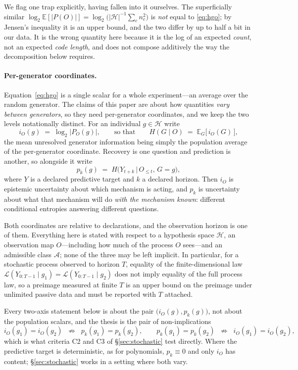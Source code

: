 \documentclass[11pt]{article}
\newcommand{\HH}{\ensuremath{\mathcal{H}}}
\begin{document}
We flag one trap explicitly, having fallen into it ourselves. The superficially similar
$\log_2 \mathbb{E}[|P(O)|] = \log_2\big(|\HH|^{-1}\sum_c n_c^2\big)$ is \emph{not}
equal to \eqref{eq:hgo}; by Jensen's inequality it is an upper bound, and the two
differ by up to half a bit in our data. It is the wrong quantity here because it is the
log of an expected \emph{count}, not an expected \emph{code length}, and does not
compose additively the way the decomposition below requires.

\paragraph{Per-generator coordinates.}
Equation~\eqref{eq:hgo} is a single scalar for a whole experiment---an average over the
random generator. The claims of this paper are about how quantities \emph{vary between
generators}, so they need per-generator coordinates, and we keep the two levels
notationally distinct. For an individual $g \in \HH$ write
\[
  i_O(g) \;=\; \log_2\big|P_O(g)\big|,
  \qquad\text{so that}\qquad
  H(G \mid O) \;=\; \mathbb{E}_G\big[\,i_O(G)\,\big],
\]
the mean unresolved generator information being simply the population average of the
per-generator coordinate. Recovery is one question and prediction is another, so alongside
it write
\[
  p_k(g) \;=\; H\big(Y_{t+k} \,\big|\, O_{\le t},\, G = g\big),
\]
where $Y$ is a declared predictive target and $k$ a declared horizon. Then $i_O$ is
epistemic uncertainty about which mechanism is acting, and $p_k$ is uncertainty about
what that mechanism will do \emph{with the mechanism known}: different conditional
entropies answering different questions.

Both coordinates are relative to declarations, and the observation horizon is one of
them. Everything here is stated with respect to a hypothesis space $\HH$, an observation
map $O$---including how much of the process $O$ sees---and an admissible class
$\mathcal{A}$; none of the three may be left implicit. In particular, for a stochastic
process observed to horizon $T$, equality of the finite-dimensional law
$\mathcal{L}(Y_{0:T-1} \mid g_1) = \mathcal{L}(Y_{0:T-1} \mid g_2)$ does not imply equality
of the full process law, so a preimage measured at finite $T$ is an upper bound on the
preimage under unlimited passive data and must be reported with $T$ attached.

Every two-axis statement below is about the pair $\big(i_O(g), p_k(g)\big)$, not about
the population scalars, and the thesis is the pair of non-implications
\begin{equation}\label{eq:nonimp}
  i_O(g_1) = i_O(g_2) \;\;\not\Longrightarrow\;\; p_k(g_1) = p_k(g_2),
  \qquad
  p_k(g_1) = p_k(g_2) \;\;\not\Longrightarrow\;\; i_O(g_1) = i_O(g_2),
\end{equation}
which is what criteria C2 and C3 of \S\ref{sec:stochastic} test directly. Where the
predictive target is deterministic, as for polynomials, $p_k \equiv 0$ and only $i_O$ has
content; \S\ref{sec:stochastic} works in a setting where both vary.
\end{document}
